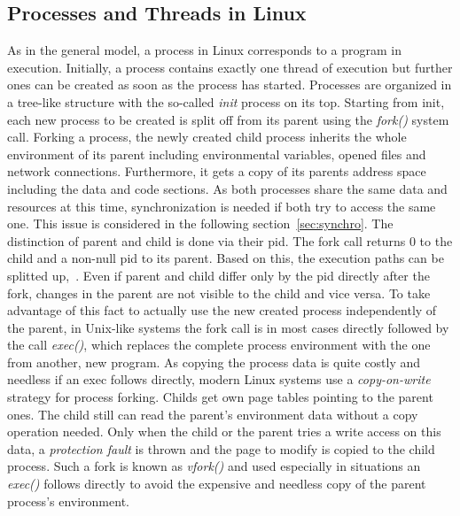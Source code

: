 \subsection{Processes and Threads in Linux} 
As in the general model, a process in Linux corresponds to a program in execution.
Initially, a process contains exactly one thread of execution but further ones can be created as soon as the process has started\cite{tanenbaum-modern-operating-systems}.
Processes are organized in a tree-like structure with the so-called \textit{init} process on its top.
Starting from init, each new process to be created is split off from its parent using the \textit{fork()} system call.
Forking a process, the newly created child process inherits the whole environment of its parent including environmental variables, opened files and network connections.
Furthermore, it gets a copy of its parents address space including the data and code sections.
As both processes share the same data and resources at this time, synchronization is needed if both try to access the same one\cite{mandl2014Grundkurs}.
This issue is considered in the following section~\ref{sec:synchro}.
The distinction of parent and child is done via their \ac{pid}.
The fork call returns 0 to the child and a non-null \ac{pid} to its parent. 
Based on this, the execution paths can be splitted up\cite{tanenbaum-modern-operating-systems},~\cite{mandl2014Grundkurs}.
Even if parent and child differ only by the \ac{pid} directly after the fork, changes in the parent are not visible to the child and vice versa.
To take advantage of this fact to actually use the new created process independently of the parent, in Unix-like systems the fork call is in most cases directly followed by the call \textit{exec()}, which replaces the complete process environment with the one from another, new program.
As copying the process data is quite costly and needless if an exec follows directly, modern Linux systems use a \textit{copy-on-write} strategy for process forking.
Childs get own page tables pointing to the parent ones.
The child still can read the parent's environment data without a copy operation needed. 
Only when the child or the parent tries a write access on this data, a \textit{protection fault} is thrown and the page to modify is copied to the child process\cite{tanenbaum-modern-operating-systems}.
Such a fork is known as \textit{vfork()} and used especially in situations an \textit{exec()} follows directly to avoid the expensive and needless copy of the parent process's environment\cite{mandl2014Grundkurs}.


